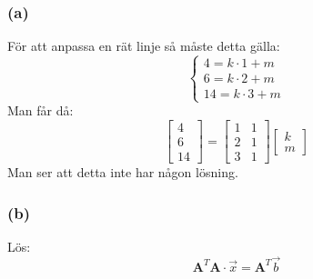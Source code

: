 \subsubsection{(a)}
För att anpassa en rät linje så måste detta gälla:
\[
    \begin{cases}
        4 = k \cdot 1 + m\\
        6 = k \cdot 2 + m\\
        14 = k \cdot 3 + m
    \end{cases}
\]
Man får då:
\[
    \begin{bmatrix} 4\\6\\14 \end{bmatrix} =
    \begin{bmatrix}
        1 & 1\\
        2 & 1\\
        3 & 1
    \end{bmatrix}
    \begin{bmatrix} k\\m \end{bmatrix}
\]
Man ser att detta inte har någon lösning.
\subsubsection{(b)}
Lös:
\[
    \mathbf{A}^T \mathbf{A} \cdot \vec{x} = \mathbf{A}^T \vec{b}
\]
